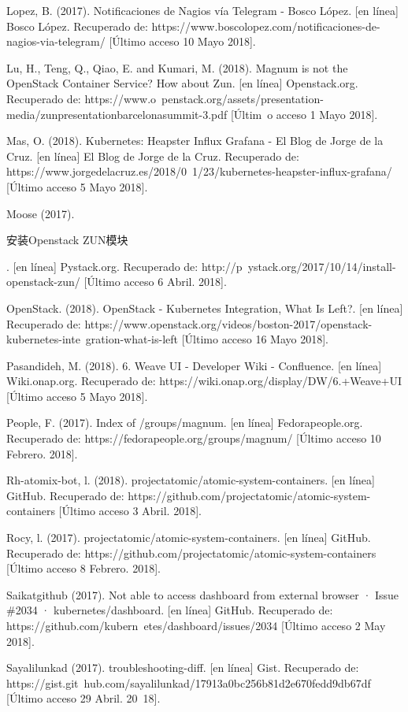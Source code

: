 Lopez, B. (2017). Notificaciones de Nagios vía Telegram - Bosco López. [en línea] Bosco López. Recuperado de: https://www.boscolopez.com/notificaciones-de-nagios-via-telegram/ [Último acceso 10 Mayo 2018].


Lu, H., Teng, Q., Qiao, E. and Kumari, M. (2018). Magnum is not the OpenStack Container Service? How about Zun. [en línea] Openstack.org. Recuperado de: https://www.o\ penstack.org/assets/presentation-media/zunpresentationbarcelonasummit-3.pdf [Últim\ o acceso 1 Mayo 2018].

Mas, O. (2018). Kubernetes: Heapster Influx Grafana - El Blog de Jorge de la Cruz. [en línea] El Blog de Jorge de la Cruz. Recuperado de: https://www.jorgedelacruz.es/2018/0\ 1/23/kubernetes-heapster-influx-grafana/ [Último acceso 5 Mayo 2018].

Moose (2017). \begin{CJK*}{UTF8}{gbsn}安装Openstack ZUN模块\end{CJK*}. [en línea] Pystack.org. Recuperado de: http://p\ ystack.org/2017/10/14/install-openstack-zun/ [Último acceso 6 Abril. 2018].

OpenStack. (2018). OpenStack - Kubernetes Integration, What Is Left?. [en línea] Recuperado de: https://www.openstack.org/videos/boston-2017/openstack-kubernetes-inte\ gration-what-is-left [Último acceso 16 Mayo 2018].

Pasandideh, M. (2018). 6. Weave UI - Developer Wiki - Confluence. [en línea] Wiki.onap.org. Recuperado de: https://wiki.onap.org/display/DW/6.+Weave+UI [Último acceso 5 Mayo 2018].

People, F. (2017). Index of /groups/magnum. [en línea] Fedorapeople.org. Recuperado de: https://fedorapeople.org/groups/magnum/ [Último acceso 10 Febrero. 2018].

Rh-atomix-bot, l. (2018). projectatomic/atomic-system-containers. [en línea] GitHub. Recuperado de: https://github.com/projectatomic/atomic-system-containers [Último acceso 3 Abril. 2018].

Rocy, l. (2017). projectatomic/atomic-system-containers. [en línea] GitHub. Recuperado de: https://github.com/projectatomic/atomic-system-containers [Último acceso 8 Febrero. 2018].

Saikatgithub (2017). Not able to access dashboard from external browser · Issue \#2034 · kubernetes/dashboard. [en línea] GitHub. Recuperado de: https://github.com/kubern\ etes/dashboard/issues/2034 [Último acceso 2 May 2018].

Sayalilunkad (2017). troubleshooting-diff. [en línea] Gist. Recuperado de: https://gist.git\ hub.com/sayalilunkad/17913a0bc256b81d2e670fedd9db67df [Último acceso 29 Abril. 20\ 18].

